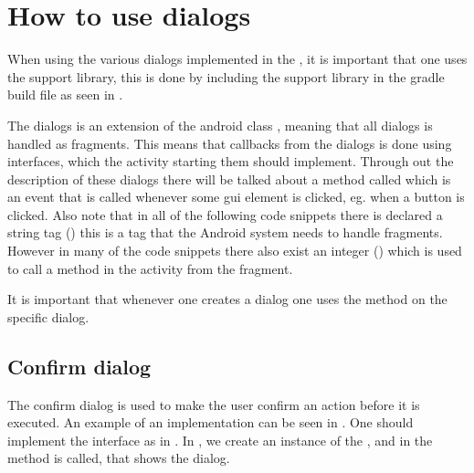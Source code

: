 \chapter{How to use dialogs}
\label{app:how_to_use_dialogs}

When using the various dialogs implemented in the \gc, it is important that one uses the support library, this is done by including the support library in the gradle build file as seen in .


\noindent
The dialogs is an extension of the android class , meaning that all dialogs is handled as fragments. This means that callbacks from the dialogs is done using interfaces, which the activity starting them should implement. Through out the description of these dialogs there will be talked about a method called  which is an event that is called whenever some gui element is clicked, eg. when a button is clicked. Also note that in all of the following code snippets there is declared a string tag () this is a tag that the Android system needs to handle fragments. However in many of the code snippets there also exist an integer () which is used to call a method in the activity from the fragment.

\begin{note}
	It is important that whenever one creates a dialog one uses the  method on the specific dialog.
\end{note}

\section{Confirm dialog}
\label{sec:impl_confirm_dialog}

The confirm dialog is used to make the user confirm an action before it is executed. An example of an implementation can be seen in . One should implement the  interface as in . In , we create an instance of the , and in  the method  is called, that shows the dialog.

